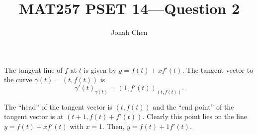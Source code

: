 \documentclass{exam}
\title{MAT257 PSET 14---Question 2}
\author{Jonah Chen}
\date{}
\numberwithin{equation}{section}
\begin{document}
    \sffamily
    \maketitle
    The tangent line of \(f\) at \(t\) is given by \(y=f(t)+xf'(t)\). The tangent vector to the curve \(\gamma(t)=(t,f(t))\) is \[\gamma'(t)_{\gamma(t)}=(1,f'(t))_{(t,f(t))}.\]

    The ``head'' of the tangent vector is \((t,f(t))\) and the ``end point'' of the tangent vector is at \((t+1,f(t)+f'(t))\). Clearly this point lies on the line \(y=f(t)+xf'(t)\) with \(x=1\). Then, \(y=f(t)+1f'(t)\).
\end{document}
